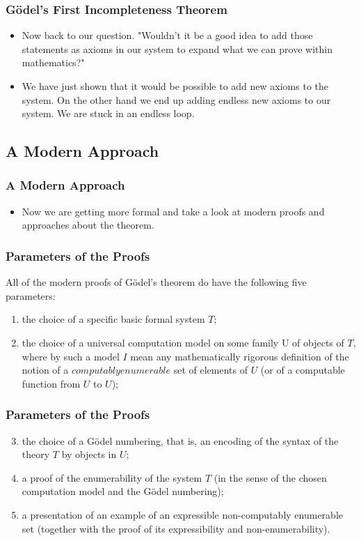 \documentclass[aspectratio=169]{beamer}
\begin{document}
\begin{frame}
	\frametitle{Gödel's First Incompleteness Theorem}
	\begin{itemize}
		\item Now back to our question. "Wouldn't it be a good idea to add those statements as axioms in our system to expand what we can prove within mathematics?"
		\item We have just shown that it would be possible to add new axioms to the system. On the other hand we end up adding endless new axioms to our system. We are stuck in an endless loop.
	\end{itemize}
\end{frame}

\subsection{A Modern Approach}
\begin{frame}
	\frametitle{A Modern Approach}
	\begin{itemize}
		\item Now we are getting more formal and take a look at modern proofs and approaches about the theorem.
	\end{itemize}
\end{frame}

\begin{frame}
	\frametitle{Parameters of the Proofs}
	All of the modern proofs of Gödel's theorem do have the following five parameters: \\ \vspace{0.5cm}
	\begin{enumerate}
		\item the choice of a specific basic formal system $T;$
		\item the choice of a universal computation model on some family U of objects of $T$, where by such a model $I$ mean any mathematically rigorous definition of the notion of a $computably enumerable$ set of elements of $U$ (or of a computable function from $U$ to $U$);
	\end{enumerate}
\end{frame}

\begin{frame}
	\frametitle{Parameters of the Proofs}
	\begin{enumerate}
	\setcounter{enumi}{2}
		\item the choice of a Gödel numbering, that is, an encoding of the syntax of the theory $T$ by objects in $U;$
		\item a proof of the enumerability of the system $T$ (in the sense of the chosen computation model and the Gödel numbering);
		\item a presentation of an example of an expressible non-computably enumerable set (together with the proof of its expressibility and non-enumerability).
	\end{enumerate}
	\begin{flushright}
		\cite{bekl}
	\end{flushright}
\end{frame}
\end{document}
